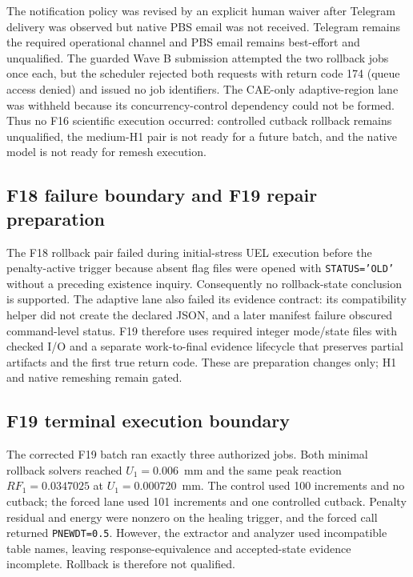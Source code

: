 The notification policy was revised by an explicit human waiver after
Telegram delivery was observed but native PBS email was not received.
Telegram remains the required operational channel and PBS email remains
best-effort and unqualified. The guarded Wave B submission attempted the two
rollback jobs once each, but the scheduler rejected both requests with return
code 174 (queue access denied) and issued no job identifiers. The CAE-only
adaptive-region lane was withheld because its concurrency-control dependency
could not be formed. Thus no F16 scientific execution occurred: controlled
cutback rollback remains unqualified, the medium-H1 pair is not ready for a
future batch, and the native model is not ready for remesh execution.

\subsection{F18 failure boundary and F19 repair preparation}

The F18 rollback pair failed during initial-stress UEL execution before the
penalty-active trigger because absent flag files were opened with
\texttt{STATUS='OLD'} without a preceding existence inquiry. Consequently no
rollback-state conclusion is supported. The adaptive lane also failed its
evidence contract: its compatibility helper did not create the declared JSON,
and a later manifest failure obscured command-level status. F19 therefore uses
required integer mode/state files with checked I/O and a separate work-to-final
evidence lifecycle that preserves partial artifacts and the first true return
code. These are preparation changes only; H1 and native remeshing remain gated.

\subsection{F19 terminal execution boundary}

The corrected F19 batch ran exactly three authorized jobs. Both minimal
rollback solvers reached $U_1=0.006$~mm and the same peak reaction
$RF_1=0.0347025$ at $U_1=0.000720$~mm. The control used 100 increments and no
cutback; the forced lane used 101 increments and one controlled cutback.
Penalty residual and energy were nonzero on the healing trigger, and the
forced call returned \texttt{PNEWDT=0.5}. However, the extractor and analyzer
used incompatible table names, leaving response-equivalence and accepted-state
evidence incomplete. Rollback is therefore not qualified.

